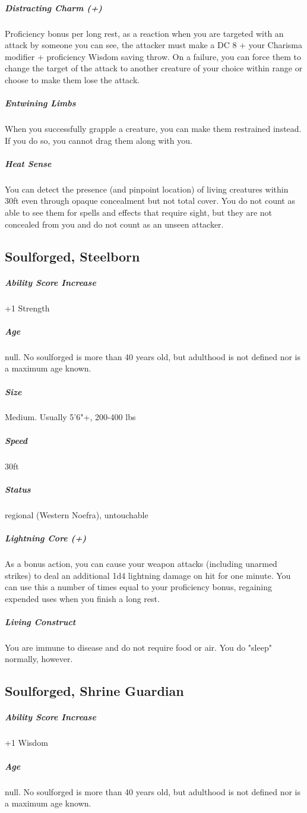 \subparagraph*{Distracting Charm (+)}  Proficiency bonus per long rest, as a reaction when you are targeted with an attack by someone you can see, the attacker must make a DC 8 + your Charisma modifier + proficiency Wisdom saving throw. On a failure, you can force them to change the target of the attack to another creature of your choice within range or choose to make them lose the attack.

\subparagraph*{Entwining Limbs}  When you successfully grapple a creature, you can make them restrained instead. If you do so, you cannot drag them along with you.

\subparagraph*{Heat Sense}  You can detect the presence (and pinpoint location) of living creatures within 30ft even through opaque concealment but not total cover. You do not count as able to see them for spells and effects that require sight, but they are not concealed from you and do not count as an unseen attacker.

\subsection{Soulforged, Steelborn}

\subparagraph*{Ability Score Increase}  +1 Strength

\subparagraph*{Age}  null. No soulforged is more than 40 years old, but adulthood is not defined nor is a maximum age known.

\subparagraph*{Size}  Medium. Usually 5'6"+, 200-400 lbs

\subparagraph*{Speed}  30ft
\subparagraph*{Status}  regional (Western Noefra), untouchable

\subparagraph*{Lightning Core (+)}  As a bonus action, you can cause your weapon attacks (including unarmed strikes) to deal an additional 1d4 lightning damage on hit for one minute. You can use this a number of times equal to your proficiency bonus, regaining expended uses when you finish a long rest.

\subparagraph*{Living Construct}  You are immune to disease and do not require food or air. You do "sleep" normally, however.

\subsection{Soulforged, Shrine Guardian}

\subparagraph*{Ability Score Increase}  +1 Wisdom

\subparagraph*{Age}  null. No soulforged is more than 40 years old, but adulthood is not defined nor is a maximum age known.

